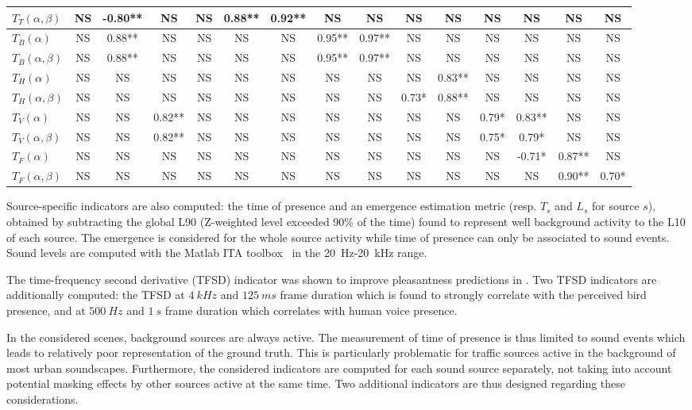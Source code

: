 \documentclass{article}
\begin{document}
\begin{sloppy}
\begin{table}[ht!]
{\begin{tabular}{ l | c c c c c c c c c c c c c c }
	$T_T(\alpha, \beta)$ & NS & -0.80** & NS & NS & 0.88** & 0.92** & NS & NS & NS & NS & NS & NS & NS & NS \\ \hline
	$T_B(\alpha)$ & NS & 0.88** & NS & NS & NS & NS & 0.95** & 0.97** & NS & NS & NS & NS & NS & NS \\
	$T_B(\alpha, \beta)$ & NS & 0.88** & NS & NS & NS & NS & 0.95** & 0.97** & NS & NS & NS & NS & NS & NS \\ \hline
	$T_H(\alpha)$ & NS & NS & NS & NS & NS & NS & NS & NS & NS & 0.83** & NS & NS & NS & NS \\
	$T_H(\alpha, \beta)$ & NS & NS & NS & NS & NS & NS & NS & NS & 0.73* & 0.88** & NS & NS & NS & NS \\ \hline
	$T_V(\alpha)$ & NS & NS & 0.82** & NS & NS & NS & NS & NS & NS & NS & 0.79* & 0.83** & NS & NS \\
	$T_V(\alpha, \beta)$ & NS & NS & 0.82** & NS & NS & NS & NS & NS & NS & NS & 0.75* & 0.79* & NS & NS \\ \hline
	$T_F(\alpha)$ & NS & NS & NS & NS & NS & NS & NS & NS & NS & NS & NS & -0.71* & 0.87** & NS \\
	$T_F(\alpha, \beta)$ & NS & NS & NS & NS & NS & NS & NS & NS & NS & NS & NS & NS & 0.90** & 0.70* \\ \hline
\end{tabular}
}
\end{table}

Source-specific indicators are also computed: the time of presence and an emergence estimation metric (resp. $T_s$ and $L_s$ for source $s$), obtained by subtracting the global L90 (Z-weighted level exceeded 90\% of the time) found to represent well background activity to the L10 of each source. The emergence is considered for the whole source activity while time of presence can only be associated to sound events. Sound levels are computed with the Matlab ITA toolbox~\cite{itatoolbox2017} in the 20~Hz-20~kHz range.

The time-frequency second derivative (TFSD) indicator was shown to improve pleasantness predictions in \cite{aumond2017}. Two TFSD indicators are additionally computed: the TFSD at $4~kHz$ and $125~ms$ frame duration which is found to strongly correlate with the perceived bird presence, and at $500~Hz$ and $1~s$ frame duration which correlates with human voice presence.

In the considered scenes, background sources are always active. The measurement of time of presence is thus limited to sound events which leads to relatively poor representation of the ground truth. This is particularly problematic for traffic sources active in the background of most urban soundscapes. Furthermore, the considered indicators are computed for each sound source separately, not taking into account potential masking effects by other sources active at the same time. Two additional indicators are thus designed regarding these considerations.


\end{sloppy}
\end{document}
